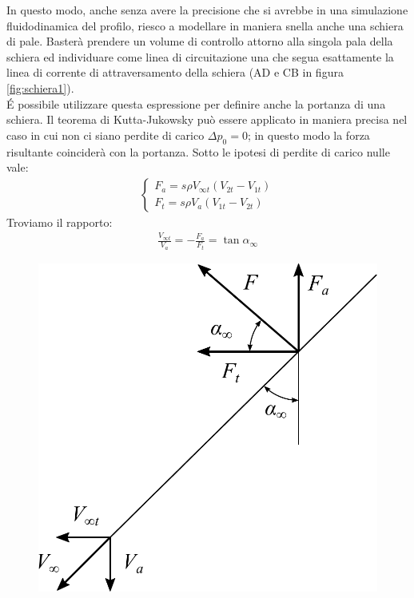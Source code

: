 In questo modo, anche senza avere la precisione che si avrebbe in una simulazione fluidodinamica del profilo, riesco a modellare in maniera snella anche una schiera di pale. Basterà prendere un volume di controllo attorno alla singola pala della schiera ed individuare come linea di circuitazione una che segua esattamente la linea di corrente di attraversamento della schiera (AD e CB in figura \ref{fig:schiera1}).\\
\'E possibile utilizzare questa espressione per definire anche la portanza di una schiera. Il teorema di Kutta-Jukowsky può essere applicato in maniera precisa nel caso in cui non ci siano perdite di carico $\Delta p_0=0$; in questo modo la forza risultante coinciderà con la portanza. Sotto le ipotesi di perdite di carico nulle vale:
\begin{align*}
\begin{cases}
F_a = s \rho V_{\infty t} (V_{2t}-V_{1t})\\
F_t = s \rho V_a (V_{1t}-V_{2t})
\end{cases}
\end{align*}
Troviamo il rapporto:
\begin{align*}
	\frac{V_{\infty t}}{V_a}=-\frac{F_a}{F_t} = \tan \alpha_{\infty}
\end{align*}
\begin{figure}
	\centering
	\begin{minipage}{.4\textwidth}
		\centering
		\includegraphics[width=.95\linewidth]{fig/forzaKJ.pdf}
		\label{fig:forzaKJ}
	\end{minipage}
\end{figure}
